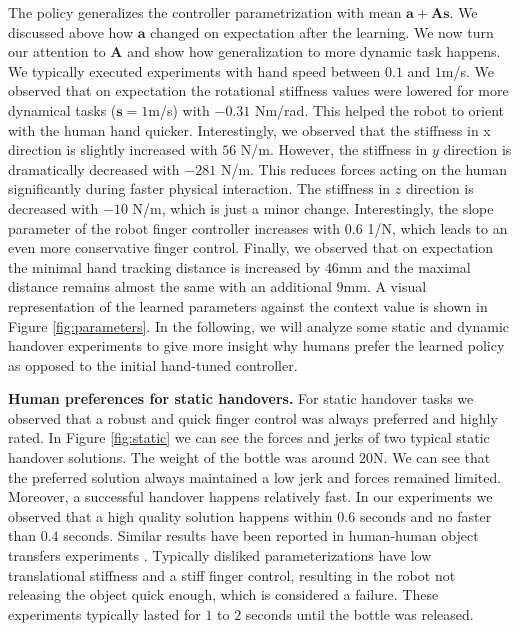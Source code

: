 The policy generalizes the controller parametrization with mean $\boldsymbol{a} +
\boldsymbol{A}  {\boldsymbol{s}} $. We discussed above how $\boldsymbol{a}$ changed on expectation after the learning. We now turn our attention to $\boldsymbol{A}$ and show how generalization to more dynamic task happens. We typically executed experiments with hand speed between $0.1$ and $1$m/s. We observed that on expectation the rotational stiffness values were lowered for more dynamical tasks ($  {\boldsymbol{s}}  =1$m/s) with $-0.31$ Nm/rad. This helped the robot to orient with the human hand quicker. Interestingly, we observed that the stiffness in x direction is slightly increased with $56$ N/m. However, the stiffness in $y$ direction is dramatically decreased with $-281$ N/m. This reduces forces acting on the human significantly during faster physical interaction. The stiffness in $z$ direction is decreased with $-10$ N/m, which is just a minor change. Interestingly, the slope parameter of the robot finger controller increases with $0.6$ 1/N, which leads to an even more conservative finger control. Finally, we observed that on expectation the minimal hand tracking distance is increased by $46$mm and the maximal distance remains almost the same with an additional $9$mm. A visual representation of the learned parameters against the context value is shown in Figure \ref{fig:parameters}.  
In the following, we will analyze some static and dynamic handover experiments to give more insight why humans prefer the learned policy as opposed to the initial hand-tuned controller. 

\textbf{Human preferences for static handovers.} For static handover tasks we observed that a robust and quick finger control was always preferred and highly rated. In Figure
\ref{fig:static} we can see the forces and jerks of two typical static handover solutions. The weight of the bottle was around $20$N. We can see that the preferred solution always maintained a low jerk and forces remained limited. Moreover, a successful handover happens relatively fast. In our experiments we observed that a high quality solution happens within $0.6$ seconds and no faster than $0.4$ seconds. Similar results have been reported in human-human object transfers experiments \citep{ChaPar13}. Typically disliked parameterizations have low translational stiffness and a stiff finger control, resulting in the robot not releasing the object quick enough, which is considered a failure. These experiments typically lasted for $1$ to $2$ seconds until the bottle was released. 

